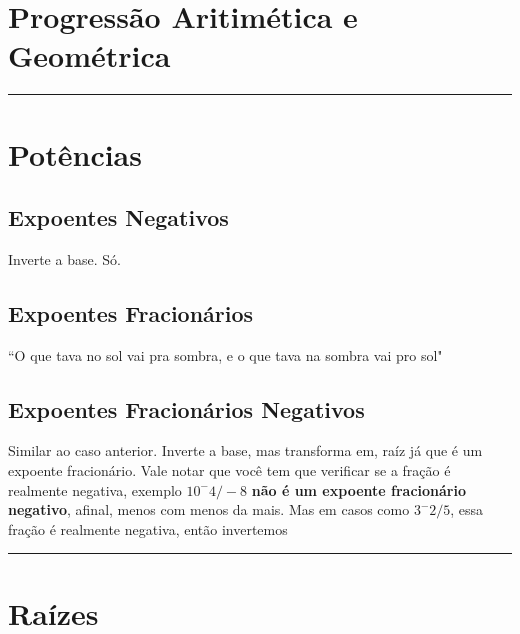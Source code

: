 \documentclass{article}
\begin{document}
\section{Progressão Aritimética e Geométrica}
\hrule
\vspace{10pt}
\section{Potências}
\subsection{Expoentes Negativos}
Inverte a base. Só.

\subsection{Expoentes Fracionários}
``O que tava no sol vai pra sombra, e o que tava na sombra vai pro sol"

\subsection{Expoentes Fracionários Negativos}
Similar ao caso anterior. Inverte a base, mas transforma em, raíz já que é um expoente fracionário. Vale notar que você tem que verificar se a fração é realmente negativa, exemplo $10^-4/-8$ \textbf{não é um expoente fracionário negativo}, afinal, menos com menos da mais. Mas em casos como $3^-2/5$, essa fração é realmente negativa, então invertemos
\vspace{10pt}
\hrule
\vspace{10pt}
\section{Raízes}
\end{document}
